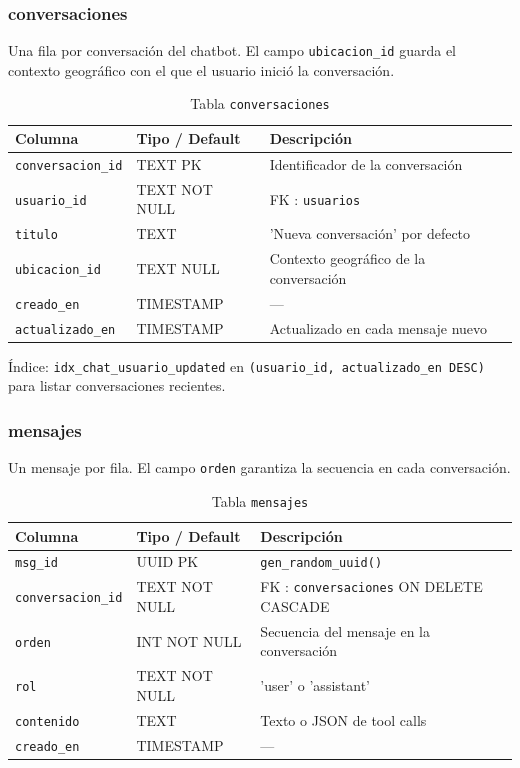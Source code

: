 \documentclass[12pt, a4paper]{article}
\begin{document}
\subsubsection{conversaciones}

Una fila por conversación del chatbot. El campo \texttt{ubicacion\_id} guarda el contexto geográfico con el que el usuario inició la conversación.

\begin{table}[H]
\centering
\renewcommand{\arraystretch}{1.2}
\begin{tabular}{llp{5.5cm}}
\toprule
\textbf{Columna} & \textbf{Tipo / Default} & \textbf{Descripción} \\
\midrule
\texttt{conversacion\_id} & TEXT PK       & Identificador de la conversación \\
\texttt{usuario\_id}      & TEXT NOT NULL & FK : \texttt{usuarios} \\
\texttt{titulo}           & TEXT          & 'Nueva conversación' por defecto \\
\texttt{ubicacion\_id}    & TEXT NULL     & Contexto geográfico de la conversación \\
\texttt{creado\_en}       & TIMESTAMP     & — \\
\texttt{actualizado\_en}  & TIMESTAMP     & Actualizado en cada mensaje nuevo \\
\bottomrule
\end{tabular}
\caption{Tabla \texttt{conversaciones}}
\end{table}

Índice: \texttt{idx\_chat\_usuario\_updated} en \texttt{(usuario\_id, actualizado\_en DESC)} para listar conversaciones recientes.

\subsubsection{mensajes}

Un mensaje por fila. El campo \texttt{orden} garantiza la secuencia en cada conversación.

\begin{table}[H]
\centering
\renewcommand{\arraystretch}{1.2}
\begin{tabular}{llp{5.5cm}}
\toprule
\textbf{Columna} & \textbf{Tipo / Default} & \textbf{Descripción} \\
\midrule
\texttt{msg\_id}          & UUID PK       & \texttt{gen\_random\_uuid()} \\
\texttt{conversacion\_id} & TEXT NOT NULL & FK : \texttt{conversaciones} ON DELETE CASCADE \\
\texttt{orden}            & INT NOT NULL  & Secuencia del mensaje en la conversación \\
\texttt{rol}              & TEXT NOT NULL & 'user' o 'assistant' \\
\texttt{contenido}        & TEXT          & Texto o JSON de tool calls \\
\texttt{creado\_en}       & TIMESTAMP     & — \\
\bottomrule
\end{tabular}
\caption{Tabla \texttt{mensajes}}
\end{table}
\end{document}
